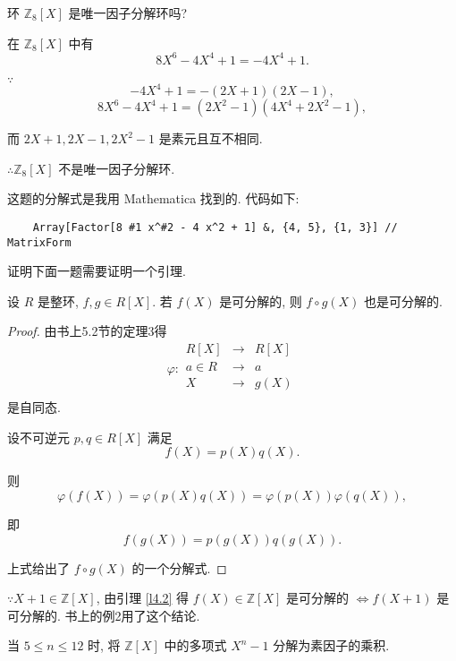 \documentclass[color=black,device=normal,lang=cn,mode=geye]{elegantnote}
\begin{document}
\begin{exercise}%
    环 $\mathbb{Z}_8[X]$ 是唯一因子分解环吗?
\end{exercise}
\begin{solution}
    在 $\mathbb{Z}_8[X]$ 中有
    \[8X^6-4X^4+1=-4X^4+1.\]

    $\because$
    \[-4X^4+1=-(2X+1)(2X-1),\]
    \[8X^6-4X^4+1=(2X^2-1)(4X^4+2X^2-1),\]

    而 $2X+1,2X-1,2X^2-1$ 是素元且互不相同.

    $\therefore\mathbb{Z}_8[X]$ 不是唯一因子分解环.
\end{solution}
\begin{note}
    这题的分解式是我用 Mathematica 找到的. 代码如下:
    \begin{lstlisting}
    Array[Factor[8 #1 x^#2 - 4 x^2 + 1] &, {4, 5}, {1, 3}] // MatrixForm
    \end{lstlisting}
\end{note}
证明下面一题需要证明一个引理.
\begin{lemma}\label{l4.2}
    设 $R$ 是整环, $f,g\in R[X]$. 若 $f(X)$ 是可分解的, 则 $f\circ g(X)$ 也是可分解的.
\end{lemma}
\begin{proof}
    由书上5.2节的定理3得
    \[\varphi:\begin{array}{rcl}
        R[X] & \to & R[X] \\
        a\in R & \to & a \\
        X & \to & g(X) \\
    \end{array}\]
    是自同态.

    设不可逆元 $p,q\in R[X]$ 满足
    \[f(X)=p(X)q(X).\]

    则
    \[\varphi(f(X))=\varphi(p(X)q(X))=\varphi(p(X))\varphi(q(X)),\]

    即
    \[f(g(X))=p(g(X))q(g(X)).\]

    上式给出了 $f\circ g(X)$ 的一个分解式.
\end{proof}
\begin{note}
    $\because X+1\in\mathbb{Z}[X]$, 由引理 \ref{l4.2} 得 $f(X)\in\mathbb{Z}[X]$ 是可分解的 $\Leftrightarrow f(X+1)$ 是可分解的. 书上的例2用了这个结论.
\end{note}
\begin{exercise}%
    当 $5\leq n\leq 12$ 时, 将 $\mathbb{Z}[X]$ 中的多项式 $X^n-1$ 分解为素因子的乘积.
\end{exercise}
\end{document}
